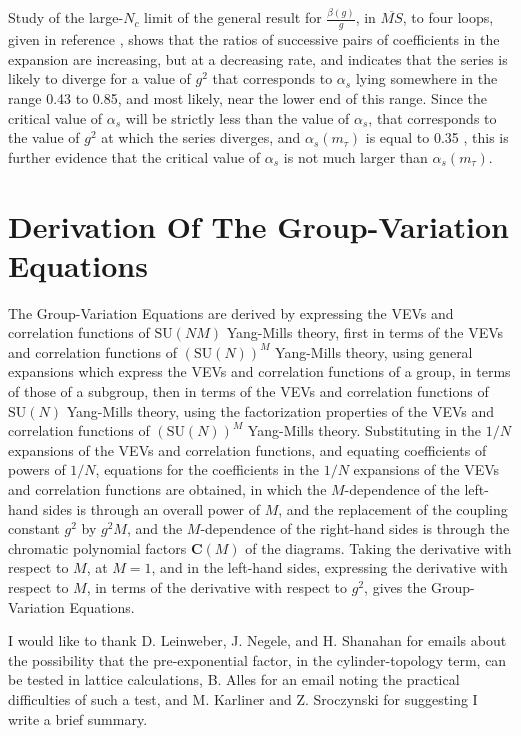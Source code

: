 \documentclass[a4paper,12pt,oneside]{article}
\begin{document}
Study of the large-$N_c$ limit of the general result for $\frac{\beta(g)}{g}$, in
$\overline{MS}$, to four loops, given in reference \cite{beta in MS bar 
2}, shows that the ratios of successive pairs of
coefficients in the expansion are increasing, but at a decreasing rate, and
indicates that the series is likely to diverge for a value of $g^2$ that
corresponds to $\alpha_s$ lying somewhere in the range 0.43 to 0.85, and
most likely, near the lower end of this range.  Since the critical value of
$\alpha_s$ will be strictly less than the value of $\alpha_s$, that
corresponds to the value of $g^2$ at which the series diverges, and
$\alpha_s(m_\tau)$ is equal to 0.35 \cite{beta in MS bar 1}, this is further evidence that the
critical value of $\alpha_s$ is not much larger than $\alpha_s(m_\tau)$.

\section{Derivation Of The Group-Variation Equations}
\label{Derivation}

The Group-Variation Equations are derived by expressing the VEVs and
correlation functions of $\textrm{SU}(NM)$ Yang-Mills theory, first in terms of the
VEVs and correlation functions of $(\textrm{SU}(N))^M$ Yang-Mills theory, using
general expansions which express the VEVs and correlation functions of a
group, in terms of those of a subgroup, then in terms of the VEVs and
correlation functions of $\textrm{SU}(N)$ Yang-Mills theory, using the factorization
properties of the VEVs and correlation functions of $(\textrm{SU}(N))^M$ Yang-Mills
theory.  Substituting in the $1/N$ expansions of the VEVs and correlation
functions, and equating coefficients of powers of $1/N$, equations for the
coefficients in the $1/N$ expansions of the VEVs and correlation functions
are obtained, in which the $M$-dependence of the left-hand sides is through
an overall power of $M$, and the replacement of the coupling constant $g^2$ by $g^2M$,
and the $M$-dependence of the right-hand sides is through the chromatic
polynomial factors $\mathbf{C}(M)$ of the diagrams.  Taking the derivative
with respect to $M$, at $M=1$, and in the left-hand sides, expressing the
derivative with respect to $M$, in terms of the derivative with respect to
$g^2$, gives the Group-Variation Equations.

\vspace{0.5cm}

I would like to thank D. Leinweber, J. Negele, and H. Shanahan for 
emails about the possibility that the pre-exponential factor, in the 
cylinder-topology term, can be tested in lattice calculations, B. Alles 
for an email noting the practical difficulties of such a test, and M. 
Karliner and Z. Sroczynski for suggesting I write a brief summary.
\end{document}
